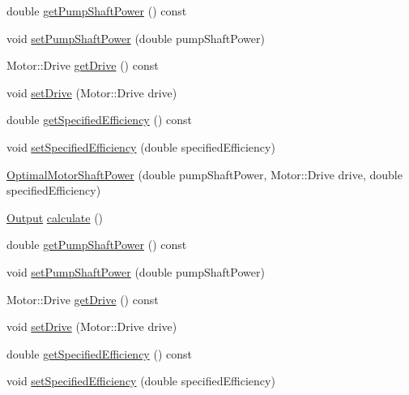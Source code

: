 \begin{DoxyCompactItemize}
\item 
double \hyperlink{class_optimal_motor_shaft_power_aca7bb632c659ecf2ebf3cb9fdb23626f}{get\+Pump\+Shaft\+Power} () const
\item 
void \hyperlink{class_optimal_motor_shaft_power_ab2d80927fbaa62705359700b2a8f2f26}{set\+Pump\+Shaft\+Power} (double pump\+Shaft\+Power)
\item 
Motor\+::\+Drive \hyperlink{class_optimal_motor_shaft_power_a3cc369285d8b3582fcd8c44e5a1c37c8}{get\+Drive} () const
\item 
void \hyperlink{class_optimal_motor_shaft_power_a8f3288a69848c61f4e8e2b14da549d16}{set\+Drive} (Motor\+::\+Drive drive)
\item 
double \hyperlink{class_optimal_motor_shaft_power_a89c2038dae30ef58245e810187c2a6c4}{get\+Specified\+Efficiency} () const
\item 
void \hyperlink{class_optimal_motor_shaft_power_a92f7da022e380abbd8cfd308e8aa5e58}{set\+Specified\+Efficiency} (double specified\+Efficiency)
\item 
\hyperlink{class_optimal_motor_shaft_power_ad830e1f8a7931e3c6bec5f8828d57e83}{Optimal\+Motor\+Shaft\+Power} (double pump\+Shaft\+Power, Motor\+::\+Drive drive, double specified\+Efficiency)
\item 
\hyperlink{struct_optimal_motor_shaft_power_1_1_output}{Output} \hyperlink{class_optimal_motor_shaft_power_a1448024727106660d94faf7f9ff2c89e}{calculate} ()
\item 
double \hyperlink{class_optimal_motor_shaft_power_aca7bb632c659ecf2ebf3cb9fdb23626f}{get\+Pump\+Shaft\+Power} () const
\item 
void \hyperlink{class_optimal_motor_shaft_power_ab2d80927fbaa62705359700b2a8f2f26}{set\+Pump\+Shaft\+Power} (double pump\+Shaft\+Power)
\item 
Motor\+::\+Drive \hyperlink{class_optimal_motor_shaft_power_a3cc369285d8b3582fcd8c44e5a1c37c8}{get\+Drive} () const
\item 
void \hyperlink{class_optimal_motor_shaft_power_a8f3288a69848c61f4e8e2b14da549d16}{set\+Drive} (Motor\+::\+Drive drive)
\item 
double \hyperlink{class_optimal_motor_shaft_power_a89c2038dae30ef58245e810187c2a6c4}{get\+Specified\+Efficiency} () const
\item 
void \hyperlink{class_optimal_motor_shaft_power_a92f7da022e380abbd8cfd308e8aa5e58}{set\+Specified\+Efficiency} (double specified\+Efficiency)
\end{DoxyCompactItemize}


